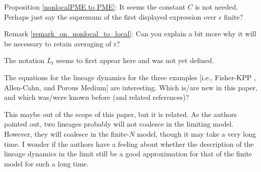 \reply{
}

\begin{point}{}
Proposition \ref{nonlocalPME to PME}:
    It seems the constant $C$ is not needed. Perhaps just say the supremum
of the first displayed expression over $\epsilon$ finite?
\end{point}

\reply{
}

\begin{point}{}
Remark \ref{remark_on_nonlocal_to_local}: Can you explain a bit more why it will be necessary to retain averaging of r?
\end{point}


\begin{point}{\revref}
The notation $L_t$ seems to first appear here and was not yet defined.
\end{point}


\begin{point}{}
    The equations for the lineage dynamics for the three examples [i.e., Fisher-KPP \revref, Allen-Cahn, and Porous Medium] are interesting.
Which is/are new in this paper, and which was/were known before (and related references)?
\end{point}


\begin{point}{}
This maybe out of the scope of this paper, but it is related. As the authors pointed out, two
lineages probably will not coalesce in the limiting model. However, they will coalesce in
the finite-$N$ model, though it may take a very long time. I wonder if the authors have a
feeling about whether the description of the lineage dynamics in the limit still be a good
approximation for that of the finite model for such a long time.
\end{point}


